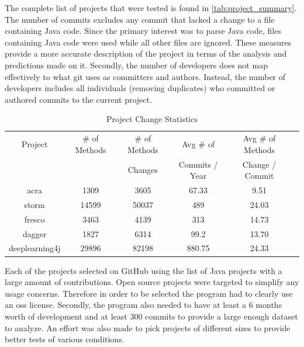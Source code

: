 The complete list of projects that were tested is found in \autoref{tab:project_summary}. The number of commits excludes any commit that lacked a change to a file containing Java code. Since the primary interest was to parse Java code, files containing Java code were used while all other files are ignored. These measures provide a more accurate description of the project in terms of the analysis and predictions made on it. Secondly, the number of developers does not map effectively to what git uses as committers and authors. Instead, the number of developers includes all individuals (removing duplicates) who committed or authored commits to the current project.

\begin{table}
\begin{center}
    \begin{tabular}{|c|c|c|c|c|c|}
        \hline
        Project & \# of Methods & \# of Methods & Avg \# of & Avg \# of Methods \\
         & & Changes & Commits / Year & Change / Commit \\
        \hline
        acra & 1309 & 3605 & 67.33 & 9.51 \\
        storm & 14599 & 50037 & 489 & 24.03 \\
        fresco & 3463 & 4139 & 313 & 14.73 \\
        dagger & 1827 & 6314 & 99.2 & 13.70 \\
        deeplearning4j & 29896 & 82198 & 880.75 & 24.33 \\
        \hline
    \end{tabular}
\end{center}
\caption{Project Change Statistics}
\label{tab:project_stats}
\end{table}

Each of the projects selected on GitHub using the list of Java projects with a large amount of contributions. Open source projects were targeted to simplify any usage concerns. Therefore in order to be selected the program had to clearly use an \gls{oss} license. Secondly, the program also needed to have at least a 6 months worth of development and at least 300 commits to provide a large enough dataset to analyze. An effort was also made to pick projects of different sizes to provide better tests of various conditions.

